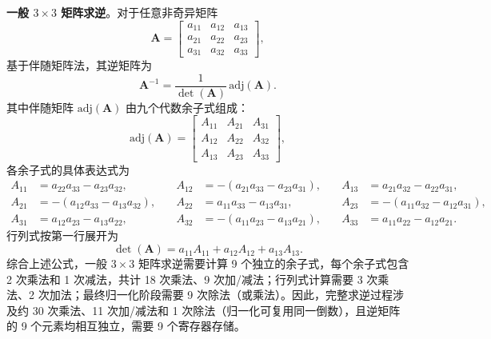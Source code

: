 \textbf{一般 $3\times3$ 矩阵求逆}。对于任意非奇异矩阵
\begin{equation}
\mathbf{A}=\begin{bmatrix}
a_{11} & a_{12} & a_{13} \\
a_{21} & a_{22} & a_{23} \\
a_{31} & a_{32} & a_{33}
\end{bmatrix},
\end{equation}
基于伴随矩阵法，其逆矩阵为
\begin{equation}\label{eq:general_inv}
\mathbf{A}^{-1}=\frac{1}{\det(\mathbf{A})}\,\mathrm{adj}(\mathbf{A}).
\end{equation}
其中伴随矩阵 $\mathrm{adj}(\mathbf{A})$ 由九个代数余子式组成：
\begin{equation}
\mathrm{adj}(\mathbf{A})=
\begin{bmatrix}
A_{11} & A_{21} & A_{31} \\
A_{12} & A_{22} & A_{32} \\
A_{13} & A_{23} & A_{33}
\end{bmatrix},
\end{equation}
各余子式的具体表达式为
\begin{equation}\label{eq:general_cofactors}
\begin{aligned}
A_{11} &= a_{22}a_{33}-a_{23}a_{32},\quad & A_{12} &= -(a_{21}a_{33}-a_{23}a_{31}),\quad & A_{13} &= a_{21}a_{32}-a_{22}a_{31}, \\
A_{21} &= -(a_{12}a_{33}-a_{13}a_{32}),\quad & A_{22} &= a_{11}a_{33}-a_{13}a_{31},\quad & A_{23} &= -(a_{11}a_{32}-a_{12}a_{31}), \\
A_{31} &= a_{12}a_{23}-a_{13}a_{22},\quad & A_{32} &= -(a_{11}a_{23}-a_{13}a_{21}),\quad & A_{33} &= a_{11}a_{22}-a_{12}a_{21}.
\end{aligned}
\end{equation}
行列式按第一行展开为
\begin{equation}\label{eq:general_det}
\det(\mathbf{A})=a_{11}A_{11}+a_{12}A_{12}+a_{13}A_{13}.
\end{equation}
综合上述公式，一般 $3\times3$ 矩阵求逆需要计算 9 个独立的余子式，每个余子式包含 2 次乘法和 1 次减法，共计 18 次乘法、9 次加/减法；行列式计算需要 3 次乘法、2 次加法；最终归一化阶段需要 9 次除法（或乘法）。因此，完整求逆过程涉及约 30 次乘法、11 次加/减法和 1 次除法（归一化可复用同一倒数），且逆矩阵的 9 个元素均相互独立，需要 9 个寄存器存储。

